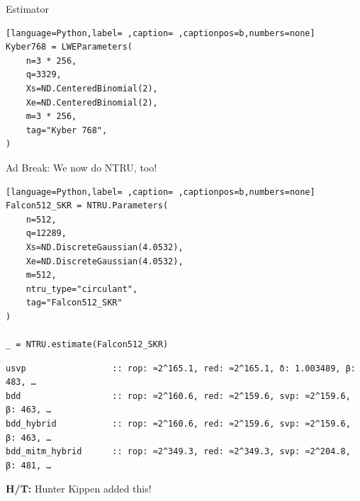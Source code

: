 \documentclass[table,10pt,aspectratio=169]{beamer}
\begin{document}
\begin{frame}[label={sec:org94a09b4},fragile]{Estimator}
 \begin{lstlisting}[language=Python,label= ,caption= ,captionpos=b,numbers=none]
Kyber768 = LWEParameters(
    n=3 * 256,
    q=3329,
    Xs=ND.CenteredBinomial(2),
    Xe=ND.CenteredBinomial(2),
    m=3 * 256,
    tag="Kyber 768",
)
\end{lstlisting}
\end{frame}

\begin{frame}[label={sec:org25cf1cc},fragile]{\alert{Ad Break: We now do NTRU, too!}}
 \begin{lstlisting}[language=Python,label= ,caption= ,captionpos=b,numbers=none]
Falcon512_SKR = NTRU.Parameters(
    n=512,
    q=12289,
    Xs=ND.DiscreteGaussian(4.0532),
    Xe=ND.DiscreteGaussian(4.0532),
    m=512,
    ntru_type="circulant",
    tag="Falcon512_SKR"
)

_ = NTRU.estimate(Falcon512_SKR)
\end{lstlisting}

\begin{verbatim}
usvp                 :: rop: ≈2^165.1, red: ≈2^165.1, δ: 1.003489, β: 483, …
bdd                  :: rop: ≈2^160.6, red: ≈2^159.6, svp: ≈2^159.6, β: 463, …
bdd_hybrid           :: rop: ≈2^160.6, red: ≈2^159.6, svp: ≈2^159.6, β: 463, …
bdd_mitm_hybrid      :: rop: ≈2^349.3, red: ≈2^349.3, svp: ≈2^204.8, β: 481, …
\end{verbatim}


\textbf{H/T:} Hunter Kippen added this!
\end{frame}
\end{document}
